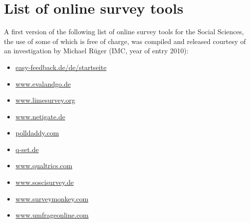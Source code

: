 \chapter[List of online survey tools]{List of online survey tools}
A first version of the following list of online survey tools for 
the Social Sciences, the use of some of which is free of charge, 
was compiled and released courtesy of an investigation by Michael 
R\"{u}ger (IMC, year of entry 2010):
%
\begin{itemize}

\item \href{http://easy-feedback.de/de/startseite}{easy-feedback.de/de/startseite}

\item \href{http://www.evalandgo.de/}{www.evalandgo.de}

\item \href{http://www.limesurvey.org}{www.limesurvey.org}

\item \href{http://www.netigate.de}{www.netigate.de}

\item \href{http://polldaddy.com/}{polldaddy.com}

\item \href{http://q-set.de}{q-set.de}

\item \href{http://www.qualtrics.com}{www.qualtrics.com}

\item \href{https://www.soscisurvey.de/}{www.soscisurvey.de}

\item \href{https://www.surveymonkey.com/}{www.surveymonkey.com}

\item \href{http://www.umfrageonline.com}{www.umfrageonline.com}

\end{itemize}
%

